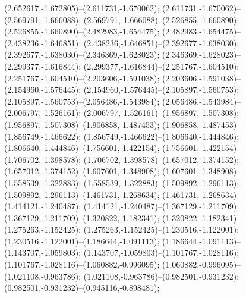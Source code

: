  (2.652617,-1.672805)--(2.611731,-1.670062);
 (2.611731,-1.670062)--(2.569791,-1.666088);
 (2.569791,-1.666088)--(2.526855,-1.660890);
 (2.526855,-1.660890)--(2.482983,-1.654475);
 (2.482983,-1.654475)--(2.438236,-1.646851);
 (2.438236,-1.646851)--(2.392677,-1.638030);
 (2.392677,-1.638030)--(2.346369,-1.628023);
 (2.346369,-1.628023)--(2.299377,-1.616844);
 (2.299377,-1.616844)--(2.251767,-1.604510);
 (2.251767,-1.604510)--(2.203606,-1.591038);
 (2.203606,-1.591038)--(2.154960,-1.576445);
 (2.154960,-1.576445)--(2.105897,-1.560753);
 (2.105897,-1.560753)--(2.056486,-1.543984);
 (2.056486,-1.543984)--(2.006797,-1.526161);
 (2.006797,-1.526161)--(1.956897,-1.507308);
 (1.956897,-1.507308)--(1.906858,-1.487453);
 (1.906858,-1.487453)--(1.856749,-1.466622);
 (1.856749,-1.466622)--(1.806640,-1.444846);
 (1.806640,-1.444846)--(1.756601,-1.422154);
 (1.756601,-1.422154)--(1.706702,-1.398578);
 (1.706702,-1.398578)--(1.657012,-1.374152);
 (1.657012,-1.374152)--(1.607601,-1.348908);
 (1.607601,-1.348908)--(1.558539,-1.322883);
 (1.558539,-1.322883)--(1.509892,-1.296113);
 (1.509892,-1.296113)--(1.461731,-1.268634);
 (1.461731,-1.268634)--(1.414121,-1.240487);
 (1.414121,-1.240487)--(1.367129,-1.211709);
 (1.367129,-1.211709)--(1.320822,-1.182341);
 (1.320822,-1.182341)--(1.275263,-1.152425);
 (1.275263,-1.152425)--(1.230516,-1.122001);
 (1.230516,-1.122001)--(1.186644,-1.091113);
 (1.186644,-1.091113)--(1.143707,-1.059803);
 (1.143707,-1.059803)--(1.101767,-1.028116);
 (1.101767,-1.028116)--(1.060882,-0.996095);
 (1.060882,-0.996095)--(1.021108,-0.963786);
 (1.021108,-0.963786)--(0.982501,-0.931232);
 (0.982501,-0.931232)--(0.945116,-0.898481);

